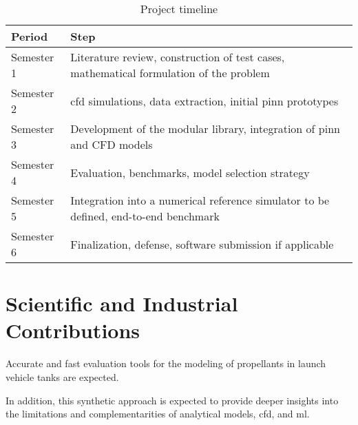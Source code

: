 \documentclass[12pt]{article}
\begin{document}
	\begin{table}[h]
		\centering
		\begin{tabularx}{\textwidth}{l X}
			
			\hline
			
			Period & Step \\
			
			\hline
			
			Semester 1 & Literature review, construction of test cases, mathematical formulation of the problem \\
			Semester 2 & \acrshort{cfd} simulations, data extraction, initial \acrshort{pinn} prototypes \\
			Semester 3 & Development of the modular library, integration of \acrshort{pinn} and CFD models \\
			Semester 4 & Evaluation, benchmarks, model selection strategy \\
			Semester 5 & Integration into a numerical reference simulator to be defined, end-to-end benchmark \\
			Semester 6 & Finalization, defense, software submission if applicable \\
			
			\hline
			
		\end{tabularx}
		\caption{Project timeline}
	\end{table}	
	
	\section*{Scientific and Industrial Contributions}
	
	Accurate and fast evaluation tools for the modeling of propellants in launch vehicle tanks are expected.
	
	In addition, this synthetic approach is expected to provide deeper insights into the limitations and complementarities of analytical models, \acrshort{cfd}, and \acrlong{ml}.
	
\end{document}
